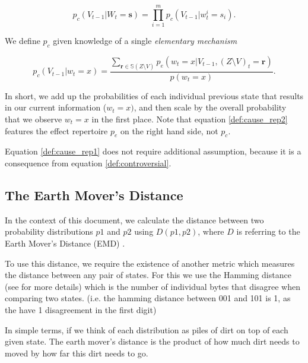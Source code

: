 \begin{equation}
\label{def:cause_rep1}
p_c(V_{t-1} | W_t=\mathbf{s}) = \prod \limits_{i = 1}^{m} p_c(V_{t-1}|w^i_{t} = s_i).
\end{equation}

We define $p_c$ given knowledge of a single \textit{elementary mechanism}

\begin{equation}
\label{def:cause_rep2}
p_c(V_{t-1}| w_t = x) = \frac{\sum \limits_{\mathbf{r} \in \mathbb{S}(Z\setminus V)} p_e(w_t = x| V_{t-1}, (Z \setminus V)_t = \mathbf{r})}{p(w_t = x)}.
\end{equation}

In short, we add up the probabilities of each individual previous state that results in our current information ($w_t = x)$, and then scale by the overall probability that we observe $w_t = x$ in the first place. Note that equation \ref{def:cause_rep2} features the effect repertoire $p_e$ on the right hand side, not $p_c$.

\begin{remark}
	Equation \ref{def:cause_rep1} does not require additional assumption, because it is a consequence from equation \ref{def:controversial}.
\end{remark}



\subsection{The Earth Mover's Distance }
In the context of this document, we calculate the distance between two probability distributions $p1$ and $p2$ using $D(p1,p2)$, where $D$ is referring to the Earth Mover's Distance (EMD) \cite{rubner1998metric}.

To use this distance, we require the existence of another metric which measures the distance between any pair of states. For this we use the Hamming distance (see \cite{hill1986first} for more details) which is the number of individual bytes that disagree when comparing two states. (i.e. the hamming distance between 001 and 101 is 1, as the have 1 disagreement in the first digit)

In simple terms, if we think of each distribution as piles of dirt on top of each given state. The earth mover's distance is the product of how much dirt needs to moved by how far this dirt needs to go. 

